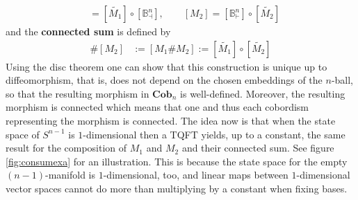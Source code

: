 \begin{align*}
  [M_{1}]
  &=
  [\tilde{M_{1}}]
  \circ
  [\mathbb{B}_{\dashv}^{n}]
  ,\qquad
  [M_{2}]
  =
  [\mathbb{B}_{\vdash}^{n}]
  \circ
  [\tilde{M_{2}}]
\end{align*}
and the \textbf{connected sum} is defined by
\begin{align*}
  [M_{1}] \# [M_{2}]
  &:=
  [M_{1} \# M_{2}]
  :=
  [\tilde{M_{1}}]
  \circ
  [\tilde{M_{2}}]
\end{align*}
Using the disc theorem one can show that this construction is unique up to diffeomorphism, that is, does not depend on the chosen embeddings of the $n$-ball, so that the resulting morphism in $\mathbf{Cob}_{n}$ is well-defined. Moreover, the resulting morphism is connected which means that one and thus each cobordism representing the morphism is connected. The idea now is that when the state space of $S^{n-1}$ is $1$-dimensional then a TQFT yields, up to a constant, the same result for the composition of $M_{1}$ and $M_{2}$ and their connected sum. See figure \ref{fig:consumexa} for an illustration. This is because the state space for the empty $(n-1)$-manifold is $1$-dimensional, too, and linear maps between $1$-dimensional vector spaces cannot do more than multiplying by a constant when fixing bases.
\\
